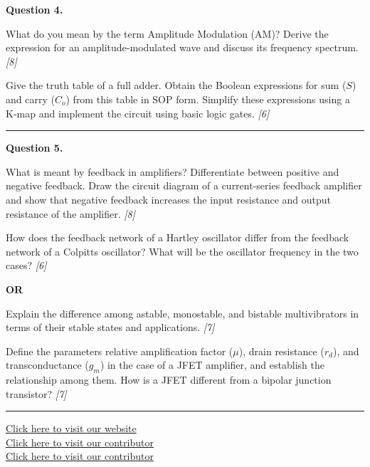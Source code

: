 \documentclass[11pt,a4paper]{article}
\newcommand{\pts}[1]{\hfill   \textit{[#1]}}
\begin{document}
\noindent   \textbf{Question 4.}

\begin{parts}
  \item What do you mean by the term Amplitude Modulation (AM)? Derive the expression for an amplitude-modulated wave and discuss its frequency spectrum. \pts{8}
  \item Give the truth table of a full adder. Obtain the Boolean expressions for sum ($S$) and carry ($C_o$) from this table in SOP form. Simplify these expressions using a K-map and implement the circuit using basic logic gates. \pts{6}
\end{parts}

\medskip\rule{\linewidth}{0.2pt}




\noindent   \textbf{Question 5.}

\begin{parts}
  \item What is meant by feedback in amplifiers? Differentiate between positive and negative feedback. Draw the circuit diagram of a current-series feedback amplifier and show that negative feedback increases the input resistance and output resistance of the amplifier. \pts{8}
  \item How does the feedback network of a Hartley oscillator differ from the feedback network of a Colpitts oscillator? What will be the oscillator frequency in the two cases? \pts{6}
\end{parts}
\hfill   \textbf{OR}

\begin{parts}
  \item Explain the difference among astable, monostable, and bistable multivibrators in terms of their stable states and applications. \pts{7}
  \item Define the parameters relative amplification factor ($\mu$), drain resistance ($r_d$), and transconductance ($g_m$) in the case of a JFET amplifier, and establish the relationship among them. How is a JFET different from a bipolar junction transistor? \pts{7}
\end{parts}

\vfill
\rule{\linewidth}{0.4pt}

\begin{center}\small
  \href{https://bhu-exam.vercel.app/}{Click here to visit our website}\\[4pt]
  \href{https://me-aryan.vercel.app/}{Click here to visit our contributor}\\[4pt]
  \href{https://quashan-me.vercel.app/}{Click here to visit our contributor}
\end{center}
\end{document}
